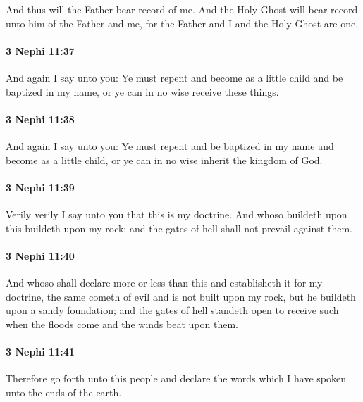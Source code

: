 			And thus will the Father bear record of me.
			And the Holy Ghost will bear record unto him of the Father and me,
			for the Father and I and the Holy Ghost are one.

		\paragraph{3 Nephi 11:37} %
			\label{3NEPHI-11-37}

			And again I say unto you:
			Ye must repent and become as a little child and be baptized in my name,
			or ye can in no wise receive these things.

		\paragraph{3 Nephi 11:38} %
			\label{3NEPHI-11-38}

			And again I say unto you:
			Ye must repent and be baptized in my name and become as a little child,
			or ye can in no wise inherit the kingdom of God.

		\paragraph{3 Nephi 11:39} %
			\label{3NEPHI-11-39}

			Verily verily I say unto you that this is my doctrine.
			And whoso buildeth upon this buildeth upon my rock;
			and the gates of hell shall not prevail against them.

		\paragraph{3 Nephi 11:40} %
			\label{3NEPHI-11-40}

			And whoso shall declare more or less than this
			and establisheth it for my doctrine,
			the same cometh of evil and is not built upon my rock,
			but he buildeth upon a sandy foundation;
			and the gates of hell standeth open to receive such
			when the floods come and the winds beat upon them.

		\paragraph{3 Nephi 11:41} %
			\label{3NEPHI-11-41}

			Therefore go forth unto this people
			and declare the words which I have spoken
			unto the ends of the earth.

